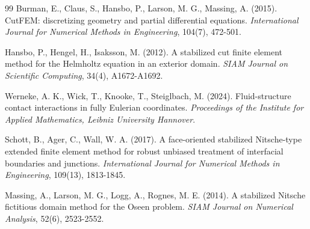 ﻿\documentclass[a4paper,11pt]{article}
\theoremstyle{definition}
\begin{document}
\begin{thebibliography}{99}
 Burman, E., Claus, S., Hansbo, P., Larson, M. G., Massing, A. (2015). CutFEM: discretizing geometry and partial differential equations. \textit{International Journal for Numerical Methods in Engineering}, 104(7), 472-501.

 Hansbo, P., Hengel, H., Isaksson, M. (2012). A stabilized cut finite element method for the Helmholtz equation in an exterior domain. \textit{SIAM Journal on Scientific Computing}, 34(4), A1672-A1692.

 Werneke, A. K., Wick, T., Knooke, T., Steiglbach, M. (2024). Fluid-structure contact interactions in fully Eulerian coordinates. \textit{Proceedings of the Institute for Applied Mathematics, Leibniz University Hannover}.

 Schott, B., Ager, C., Wall, W. A. (2017). A face-oriented stabilized Nitsche-type extended finite element method for robust unbiased treatment of interfacial boundaries and junctions. \textit{International Journal for Numerical Methods in Engineering}, 109(13), 1813-1845.

 Massing, A., Larson, M. G., Logg, A., Rognes, M. E. (2014). A stabilized Nitsche fictitious domain method for the Oseen problem. \textit{SIAM Journal on Numerical Analysis}, 52(6), 2523-2552.

\end{thebibliography}
\end{document}
